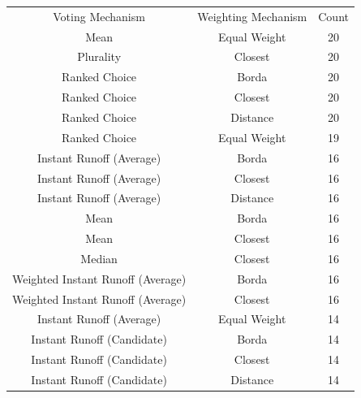 \begin{table}[htbp]
    \centering
    \begin{tabular}{|c|c|c|}
        \hline
        Voting Mechanism                    & Weighting Mechanism & Count \\
        \hhline{|=|=|=|}
        Mean                                & Equal Weight        & 20    \\
        \hline
        Plurality                           & Closest             & 20    \\
        \hline
        Ranked Choice                       & Borda               & 20    \\
        \hline
        Ranked Choice                       & Closest             & 20    \\
        \hline
        Ranked Choice                       & Distance            & 20    \\
        \hline
        Ranked Choice                       & Equal Weight        & 19    \\
        \hline
        Instant Runoff (Average)            & Borda               & 16    \\
        \hline
        Instant Runoff (Average)            & Closest             & 16    \\
        \hline
        Instant Runoff (Average)            & Distance            & 16    \\
        \hline
        Mean                                & Borda               & 16    \\
        \hline
        Mean                                & Closest             & 16    \\
        \hline
        Median                              & Closest             & 16    \\
        \hline
        Weighted Instant Runoff (Average)   & Borda               & 16    \\
        \hline
        Weighted Instant Runoff (Average)   & Closest             & 16    \\
        \hline
        Instant Runoff (Average)            & Equal Weight        & 14    \\
        \hline
        Instant Runoff (Candidate)          & Borda               & 14    \\
        \hline
        Instant Runoff (Candidate)          & Closest             & 14    \\
        \hline
        Instant Runoff (Candidate)          & Distance            & 14    \\

\end{tabular}
\end{table}
